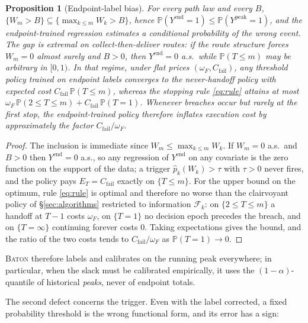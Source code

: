 \documentclass[preprint,authoryear,12pt]{elsarticle}
\newtheorem{proposition}[theorem]{Proposition}
\theoremstyle{definition}
\theoremstyle{remark}
\begin{document}
\begin{proposition}[Endpoint-label bias]\label{prop:bias}
For every path law and every $B$,
$\{W_m > B\} \subseteq \{\max_{k\le m} W_k > B\}$, hence
$\mathbb P(Y^{\mathrm{end}}{=}1) \le \mathbb P(Y^{\mathrm{peak}}{=}1)$,
and the endpoint-trained regression estimates a conditional probability
of the wrong event. The gap is extremal on collect-then-deliver routes:
if the route structure forces $W_m = 0$ almost surely and $B > 0$, then
$Y^{\mathrm{end}} = 0$ a.s.\ while $\mathbb P(T \le m)$ may be arbitrary
in $[0,1)$. In that regime, under flat prices
$(\omega_F, C_{\mathrm{fail}})$, any threshold policy trained on
endpoint labels converges to the never-handoff policy with expected cost
$C_{\mathrm{fail}}\,\mathbb P(T\le m)$, whereas the stopping rule
\eqref{eq:rule} attains at most
$\omega_F\,\mathbb P(2 \le T \le m) +
C_{\mathrm{fail}}\,\mathbb P(T = 1)$. Whenever breaches occur but rarely
at the first stop, the endpoint-trained policy therefore inflates
execution cost by approximately the factor
$C_{\mathrm{fail}}/\omega_F$.
\end{proposition}

\begin{proof}
The inclusion is immediate since $W_m \le \max_{k\le m} W_k$. If
$W_m = 0$ a.s.\ and $B > 0$ then $Y^{\mathrm{end}} = 0$ a.s., so any
regression of $Y^{\mathrm{end}}$ on any covariate is the zero function
on the support of the data; a trigger $\hat p_k(W_k) > \tau$ with
$\tau > 0$ never fires, and the policy pays $E_T = C_{\mathrm{fail}}$
exactly on $\{T \le m\}$. For the upper bound on the optimum, rule
\eqref{eq:rule} is optimal and therefore no worse than the clairvoyant
policy of \S\ref{sec:algorithms} restricted to information
$\mathcal F_k$: on $\{2 \le T \le m\}$ a handoff at $T-1$ costs
$\omega_F$, on $\{T = 1\}$ no decision epoch precedes the breach, and on
$\{T = \infty\}$ continuing forever costs $0$. Taking expectations gives
the bound, and the ratio of the two costs tends to
$C_{\mathrm{fail}}/\omega_F$ as $\mathbb P(T{=}1) \to 0$.
\end{proof}

\textsc{Baton} therefore labels and calibrates on the running peak
everywhere; in particular, when the slack must be calibrated
empirically, it uses the $(1{-}\alpha)$-quantile of historical
\emph{peaks}, never of endpoint totals.

The second defect concerns the trigger. Even with the label corrected,
a fixed probability threshold is the wrong functional form, and its
error has a sign:
\end{document}
